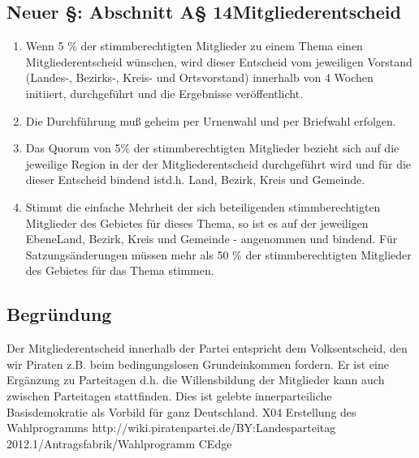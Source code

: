 \documentclass[12pt,a4paper,oneside]{scrbook}
\begin{document}
\subsection{Neuer §: Abschnitt A§ 14Mitgliederentscheid}
\begin{enumerate}
	\item Wenn 5 \% der stimmberechtigten Mitglieder zu einem Thema einen Mitgliederentscheid wünschen, wird dieser Entscheid vom jeweiligen Vorstand (Landes-, Bezirks-, Kreis- und Ortsvorstand) innerhalb von 4 Wochen initiiert, durchgeführt und die Ergebnisse veröffentlicht.
	\item Die Durchführung muß geheim per Urnenwahl und per Briefwahl erfolgen.
	\item Das Quorum von 5\% der stimmberechtigten Mitglieder bezieht sich auf die jeweilige Region in der der Mitgliederentscheid durchgeführt wird und für die dieser Entscheid bindend istd.h. Land, Bezirk, Kreis und Gemeinde.
	\item Stimmt die einfache Mehrheit der sich beteiligenden stimmberechtigten Mitglieder des Gebietes
für dieses Thema, so ist es auf der jeweiligen EbeneLand, Bezirk, Kreis und Gemeinde -
angenommen und bindend. Für Satzungsänderungen müssen mehr als 50 \% der stimmberechtigten
Mitglieder des Gebietes für das Thema stimmen.
\end{enumerate}
\subsection{Begründung}
Der Mitgliederentscheid innerhalb der Partei entspricht dem Volksentscheid, den wir Piraten z.B. beim bedingungslosen
Grundeinkommen fordern. Er ist eine Ergänzung zu Parteitagen d.h. die Willensbildung der Mitglieder kann auch zwischen
Parteitagen stattfinden. Dies ist gelebte innerparteiliche Basisdemokratie als Vorbild für ganz Deutschland.
\sonstigerantrag
{X04}
{Erstellung des Wahlprogramms}
{http://wiki.piratenpartei.de/BY:Landesparteitag 2012.1/Antragsfabrik/Wahlprogramm}
{CEdge}
\end{document}
